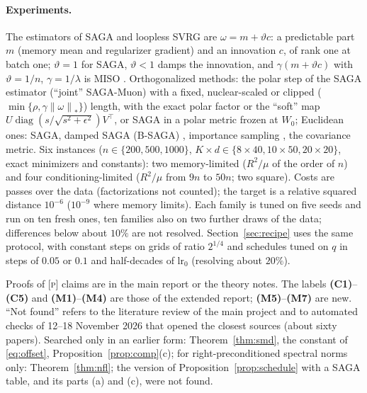 \documentclass[10pt]{article}
\makeatletter
\renewcommand\subsection{\@startsection{subsection}{2}{\z@}{-1.8ex\@plus -0.5ex \@minus -.2ex}{0.8ex \@plus .2ex}{\normalfont\normalsize\bfseries}}
\theoremstyle{remark}
\newcommand{\nnuc}[1]{\left\|#1\right\|_{*}}
\newcommand{\diag}{\operatorname{diag}}
\newcommand{\finding}[1]{\textbf{(#1)}}
\newcommand{\nat}[1]{\textsc{[#1]}}
\makeatother
\begin{document}
\paragraph{Experiments.}\label{sec:experiments} The estimators of SAGA and loopless SVRG \cite{kovalev2020dont} are
$\omega=m+\vartheta c$: a predictable part $m$ (memory mean and regularizer gradient) and an innovation $c$, of rank one at
batch one; $\vartheta=1$ for SAGA, $\vartheta<1$ damps the innovation, and $\gamma(m+\vartheta c)$ with $\vartheta=1/n$,
$\gamma=1/\lambda$ is MISO \cite{mairal2015incremental}. Orthogonalized methods: the polar step of the SAGA estimator
(``joint'' SAGA-Muon) with a fixed, nuclear-scaled or clipped ($\min\{\rho,\gamma\nnuc\omega\}$) length, with the exact
polar factor or the ``soft'' map $U\diag(s/\sqrt{s^2+\epsilon^2})V^\top$, or SAGA in a polar metric frozen at $W_0$;
Euclidean ones: SAGA, damped SAGA (B-SAGA) \cite{driggs2019biased}, importance sampling \cite{xiao2014proximal}, the
covariance metric. Six instances ($n\in\{200,500,1000\}$, $K\times d\in\{8\times40,10\times50,20\times20\}$, exact
minimizers and constants): two memory-limited ($R^2/\mu$ of the order of $n$) and four conditioning-limited ($R^2/\mu$ from
$9n$ to $50n$; two square). Costs are passes over the data (factorizations not counted); the target is a relative
squared distance $10^{-6}$ ($10^{-9}$ where memory limits). Each family is tuned on five seeds and run on ten fresh ones,
ten families also on two further draws of the data; differences below about $10\%$ are not resolved.
Section~\ref{sec:recipe} uses the same protocol, with constant steps on grids of ratio $2^{1/4}$ and schedules tuned on $q$ in steps of $0.05$ or $0.1$ and half-decades of $\mathrm{lr}_0$ (resolving about $20\%$).

\subsection{Status of the claims}\label{sec:status}

Proofs of \nat{p} claims are in the main report or the theory notes. The labels \finding{C1}--\finding{C5} and
\finding{M1}--\finding{M4} are those of the extended report; \finding{M5}--\finding{M7} are new. ``Not found'' refers to
the literature review of the main project and to automated checks of 12--18 November 2026 that opened the closest
sources (about sixty papers). Searched only in an earlier form: Theorem~\ref{thm:smd}, the constant of
\eqref{eq:offset}, Proposition~\ref{prop:comp}(c); for right-preconditioned spectral norms only: Theorem~\ref{thm:nfl};
the version of Proposition~\ref{prop:schedule} with a SAGA table, and its parts (a) and (c), were not found.
\end{document}
